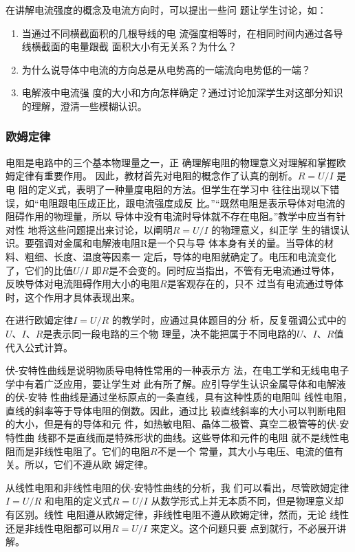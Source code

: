 在讲解电流强度的概念及电流方向时，可以提出一些问
题让学生讨论，如：
\begin{enumerate}
\item 当通过不同横截面积的几根导线的电
流强度相等时，在相同时间内通过各导线横截面的电量跟截
面积大小有无关系？为什么？    
\item 为什么说导体中电流的方向总是从电势高的一端流向电势低的一端？
\item 电解液中电流强
度的大小和方向怎样确定？通过讨论加深学生对这部分知识
的理解，澄清一些模糊认识。
\end{enumerate}


\subsubsection{欧姆定律}

电阻是电路中的三个基本物理量之一，正
确理解电阻的物理意义对理解和掌握欧姆定律有重要作用。
因此，教材首先对电阻的概念作了认真的剖析。$R=U/I$
是电
阻的定义式，表明了一种量度电阻的方法。但学生在学习中
往往出现以下错误，如“电阻跟电压成正比，跟电流强度成反
比。”“既然电阻是表示导体对电流的阻碍作用的物理量，所以
导体中没有电流时导体就不存在电阻。”教学中应当有针对性
地将这些问题提出来讨论，以阐明$R=U/I$
的物理意义，纠正学
生的错误认识。要强调对金属和电解液电阻R是一个只与导
体本身有关的量。当导体的材料、粗细、长度、温度等因素一
定后，导体的电阻就确定了。电压和电流变化了，它们的比值$U/I$
即$R$是不会变的。同时应当指出，不管有无电流通过导体，
反映导体对电流阻碍作用大小的电阻$R$是客观存在的，只不
过当有电流通过导体时，这个作用才具体表现出来。

在进行欧姆定律$I=U/R$
的教学时，应通过具体题目的分
析，反复强调公式中的$U$、$I$、$R$是表示同一段电路的三个物
理量，决不能把属于不同电路的$U$、$I$、$R$值代入公式计算。

伏-安特性曲线是说明物质导电特性常用的一种表示方
法，在电工学和无线电电子学中有着广泛应用，要让学生对
此有所了解。应引导学生认识金属导体和电解液的伏-安特
性曲线是通过坐标原点的一条直线，具有这种性质的电阻叫
线性电阻，直线的斜率等于导体电阻的倒数。因此，通过比
较直线斜率的大小可以判断电阻的大小，但是有的导体和元
件，如热敏电阻、晶体二极管、真空二极管等的伏-安特性曲
线都不是直线而是特殊形状的曲线。这些导体和元件的电阻
就不是线性电阻而是非线性电阻了。它们的电阻$R$不是一个
常量，其大小与电压、电流的值有关。所以，它们不遵从欧
姆定律。

从线性电阻和非线性电阻的伏-安特性曲线的分析，我
们可以看出，尽管欧姆定律$I=U/R$
和电阻的定义式$R=U/I$
从数学形式上并无本质不同，但是物理意义却有区别。线性
电阻遵从欧姆定律，非线性电阻不遵从欧姆定律，然而，无论
线性还是非线性电阻都可以用$R=U/I$
来定义。这个问题只要
点到就行，不必展开讲解。

